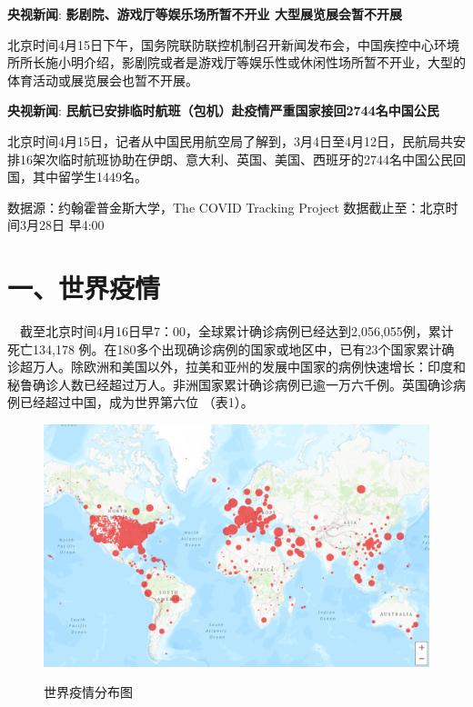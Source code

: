 \documentclass[
]{article}
\begin{document}
\textbf{\textcolor{glaucous}{央视新闻}}:
\textbf{影剧院、游戏厅等娱乐场所暂不开业 大型展览展会暂不开展 }

北京时间4月15日下午，国务院联防联控机制召开新闻发布会，中国疾控中心环境所所长施小明介绍，影剧院或者是游戏厅等娱乐性或休闲性场所暂不开业，大型的体育活动或展览展会也暂不开展。

\textbf{\textcolor{glaucous}{央视新闻}}:
\textbf{民航已安排临时航班（包机）赴疫情严重国家接回2744名中国公民}

北京时间4月15日，记者从中国民用航空局了解到，3月4日至4月12日，民航局共安排16架次临时航班协助在伊朗、意大利、英国、美国、西班牙的2744名中国公民回国，其中留学生1449名。

\newpage

%
  \noindent{}%

\begin{small}
{数据源：约翰霍普金斯大学，The COVID Tracking Project \quad   数据截止至：北京时间3月28日 早4:00}
\end{small}

\hypertarget{section-2}{%
\section{\texorpdfstring{\textcolor{glaucous}{一、世界疫情}}{}}\label{section-2}}

\(\quad\)截至北京时间4月16日早7：00，全球累计确诊病例已经达到2,056,055例，累计死亡134,178
例。在180多个出现确诊病例的国家或地区中，已有23个国家累计确诊超万人。除欧洲和美国以外，拉美和亚州的发展中国家的病例快速增长：印度和秘鲁确诊人数已经超过万人。非洲国家累计确诊病例已逾一万六千例。英国确诊病例已经超过中国，成为世界第六位
（表1）。

\begin{figure}[H]
\caption{世界疫情分布图} %
\centering
\includegraphics[]{./input/covid1.png} %
\label{} %
\end{figure}
\end{document}
